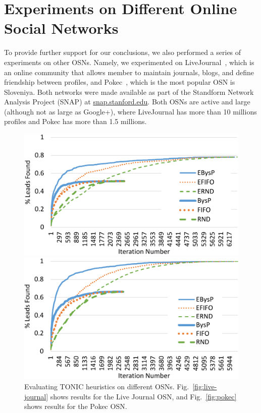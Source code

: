 \documentclass[journal]{IEEEtran}
\begin{document}





\section{Experiments on Different Online Social Networks}
\label{sec:otherNetworks}
To provide further support for our conclusions, we also performed a series of experiments on other OSNs. Namely, we experimented on LiveJournal~\cite{backstrom2006groupFormation,leskovec2009community}, which is an online community that allows member to maintain journals, blogs, and define friendship between profiles, and Pokec~\cite{takac2012data}, which is the most popular OSN is Sloveniya. Both networks were made available as part of the Standform Network Analysis Project (SNAP) at \url{snap.stanford.edu}. Both OSNs are active and large (although not as large as Google+), where LiveJournal has more than 10 millions profiles and Pokec has more than 1.5 millions. 





\begin{figure}
\centering
\begin{subfloat}[\label{fig:live-journal}]
  \centering
\includegraphics[width=.45\textwidth]{LiveJournal_cropped}
\end{subfloat}%
\begin{subfloat}[\label{fig:pokec}]
  \centering
\includegraphics[width=.45\textwidth]{Pokec_cropped}
\end{subfloat}
\caption{Evaluating TONIC heuristics on different OSNs. Fig.~\ref{fig:live-journal} shows results for the Live Journal OSN, and Fig.~\ref{fig:pokec} shows results for the Pokec OSN.}
\label{fig:extra-osns}
\end{figure}
\end{document}
